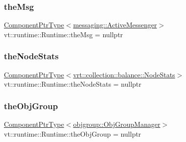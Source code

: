 \subsubsection{\texorpdfstring{the\+Msg}{theMsg}}
{\footnotesize\ttfamily \hyperlink{structvt_1_1runtime_1_1_runtime_a0893bf0a8c03b898e8ab66b52cec80ad}{Component\+Ptr\+Type}$<$\hyperlink{structvt_1_1messaging_1_1_active_messenger}{messaging\+::\+Active\+Messenger}$>$ vt\+::runtime\+::\+Runtime\+::the\+Msg = nullptr}

\mbox{\label{structvt_1_1runtime_1_1_runtime_a93ce0722815077fc9bedcd09c429b6aa}} 
\subsubsection{\texorpdfstring{the\+Node\+Stats}{theNodeStats}}
{\footnotesize\ttfamily \hyperlink{structvt_1_1runtime_1_1_runtime_a0893bf0a8c03b898e8ab66b52cec80ad}{Component\+Ptr\+Type}$<$\hyperlink{structvt_1_1vrt_1_1collection_1_1balance_1_1_node_stats}{vrt\+::collection\+::balance\+::\+Node\+Stats}$>$ vt\+::runtime\+::\+Runtime\+::the\+Node\+Stats = nullptr}

\mbox{\label{structvt_1_1runtime_1_1_runtime_af2d01d5059edf4aed086f087e5ed1e91}} 
\subsubsection{\texorpdfstring{the\+Obj\+Group}{theObjGroup}}
{\footnotesize\ttfamily \hyperlink{structvt_1_1runtime_1_1_runtime_a0893bf0a8c03b898e8ab66b52cec80ad}{Component\+Ptr\+Type}$<$\hyperlink{structvt_1_1objgroup_1_1_obj_group_manager}{objgroup\+::\+Obj\+Group\+Manager}$>$ vt\+::runtime\+::\+Runtime\+::the\+Obj\+Group = nullptr}

\mbox{\label{structvt_1_1runtime_1_1_runtime_a3001881d47dc04ed4e77a1e183dd970e}} 
